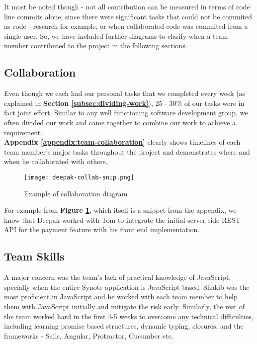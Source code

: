 It must be noted though - not all contribution can be measured in terms of code line commits alone, since there were significant tasks that could not be commited as code - research for example, or when collaborated code was commited from a single user. So, we have included further diagrams to clarify when a team member contributed to the project in the following sections. \\

\subsection{Collaboration}
\label{subsec:collaboration}

Even though we each had our personal tasks that we completed every week (as explained in \textbf{Section \ref{subsec:dividing-work}}), 25 - 30\% of our tasks were in fact joint effort. Similar to any well functioning software development group, we often divided our work and came together to combine our work to achieve a requirement.\\

\textbf{Appendix \ref{appendix:team-collaboration}} clearly shows timelines of each team member's major tasks throughout the project and demonstrates where and when he collaborated with others.\\

\begin{figure}[!hbt]
  	\centering
 	\texttt{[image: deepak-collab-snip.png]}
  	\caption{Example of collaboration diagram}
 	\label{fig:deepak-collaboration-snippet}
\end{figure}

For example from \textbf{Figure \ref{fig:deepak-collaboration-snippet}}, which itself is a snippet from the appendix, we know that Deepak worked with Tom to integrate the initial server side REST API for the payment feature with his front end implementation.

\subsection{Team Skills}
\label{subsec:team-skills}

A major concern was the team's lack of practical knowledge of JavaScript, specially when the entire Synote application is JavaScript based. Shakib was the most proficient in JavaScript and he worked with each team member to help them with JavaScript initially and mitigate the risk early. Similarly, the rest of the team worked hard in the first 4-5 weeks to overcome any technical difficulties, including learning promise based structures, dynamic typing, closures, and the frameworks - Sails, Angular, Protractor, Cucumber etc.\\


